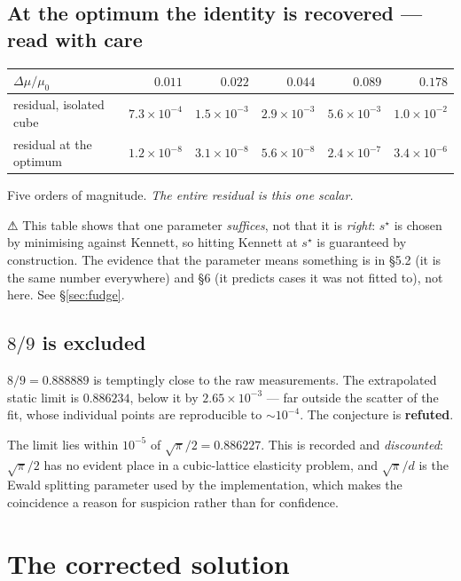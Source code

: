 \documentclass[11pt,a4paper]{article}
\newcommand{\Dmu}{\Delta\mu}
\begin{document}
\subsection{At the optimum the identity is recovered --- read with care}

\begin{center}
\begin{tabular}{lrrrrr}
\toprule
$\Dmu/\mu_0$ & $0.011$ & $0.022$ & $0.044$ & $0.089$ & $0.178$ \\
\midrule
residual, isolated cube & $7.3\!\times\!10^{-4}$ & $1.5\!\times\!10^{-3}$ &
  $2.9\!\times\!10^{-3}$ & $5.6\!\times\!10^{-3}$ & $1.0\!\times\!10^{-2}$ \\
residual at the optimum & $1.2\!\times\!10^{-8}$ & $3.1\!\times\!10^{-8}$ &
  $5.6\!\times\!10^{-8}$ & $2.4\!\times\!10^{-7}$ & $3.4\!\times\!10^{-6}$ \\
\bottomrule
\end{tabular}
\end{center}

Five orders of magnitude. \emph{The entire residual is this one scalar.}

⚠ This table shows that one parameter \emph{suffices}, not that it is
\emph{right}: $s^\star$ is chosen by minimising against Kennett, so hitting
Kennett at $s^\star$ is guaranteed by construction. The evidence that the
parameter means something is in \S5.2 (it is the same number everywhere) and \S6
(it predicts cases it was not fitted to), not here. See \S\ref{sec:fudge}.

\subsection{$8/9$ is excluded}

$8/9=0.888889$ is temptingly close to the raw measurements. The extrapolated
static limit is $0.886234$, below it by $2.65\times10^{-3}$ --- far outside the
scatter of the fit, whose individual points are reproducible to $\sim\!10^{-4}$.
The conjecture is \textbf{refuted}.

The limit lies within $10^{-5}$ of $\sqrt{\pi}/2=0.886227$. This is recorded and
\emph{discounted}: $\sqrt{\pi}/2$ has no evident place in a cubic-lattice
elasticity problem, and $\sqrt{\pi}/d$ is the Ewald splitting parameter used by
the implementation, which makes the coincidence a reason for suspicion rather
than for confidence.

\section{The corrected solution}
\end{document}
